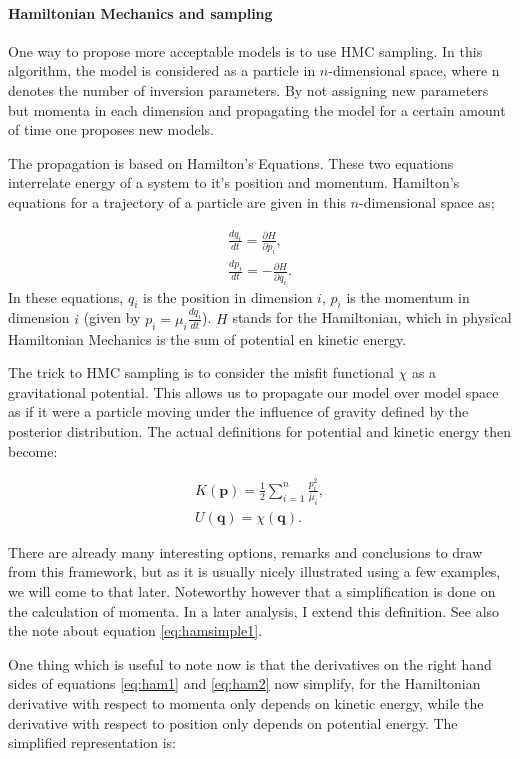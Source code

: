 \paragraph{Hamiltonian Mechanics and sampling} One way to propose more acceptable models is to use \gls{HMC} sampling. In this algorithm, the model is considered as a particle in $n$-dimensional space, where n denotes the number of inversion parameters. By not assigning new parameters but momenta in each dimension and propagating the model for a certain amount of time one proposes new models.

The propagation is based on Hamilton's Equations. These two equations interrelate energy of a system to it's position and momentum. Hamilton's equations for a trajectory of a particle are given in this $n$-dimensional space as;

\begin{gather}
	\frac{d q_i}{dt} = \frac{\partial H}{\partial p_i},\label{eq:ham1}\\
	\frac{d p_i}{dt} = - \frac{\partial H}{\partial q_i}\label{eq:ham2}.
\end{gather}
In these equations, $q_i$ is the position in dimension $i$, $p_i$ is the momentum in dimension $i$ (given by $p_i = \mu_i \frac{d q_i}{dt}$). $H$ stands for the Hamiltonian, which in physical Hamiltonian Mechanics is the sum of potential en kinetic energy.

The trick to \gls{HMC} sampling is to consider the misfit functional $\chi$ as a gravitational potential. This allows us to propagate our model over model space as if it were a particle moving under the influence of gravity defined by the posterior distribution. The actual definitions for potential and kinetic energy then become:

\begin{gather}
	K(\mathbf{p}) = \frac{1}{2} \sum_{i=1}^{n} \frac{p_i^2}{\mu_i},\\
	U(\mathbf{q}) = \chi(\mathbf{q}).
\end{gather}

There are already many interesting options, remarks and conclusions to draw from this framework, but as it is usually nicely illustrated using a few examples, we will come to that later. Noteworthy however that a simplification is done on the calculation of momenta. In a later analysis, I extend this definition. See also the note about equation \eqref{eq:hamsimple1}.

One thing which is useful to note now is that the derivatives on the right hand sides of equations \eqref{eq:ham1} and \eqref{eq:ham2} now simplify, for the Hamiltonian derivative with respect to momenta only depends on kinetic energy, while the derivative with respect to position only depends on potential energy. The simplified representation is:

